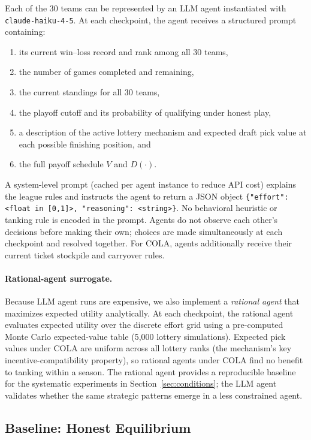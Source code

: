 \documentclass{article}
\begin{document}
Each of the 30 teams can be represented by an LLM agent instantiated with
\texttt{claude-haiku-4-5}.
At each checkpoint, the agent receives a structured prompt containing:
\begin{enumerate}
  \item its current win--loss record and rank among all 30 teams,
  \item the number of games completed and remaining,
  \item the current standings for all 30 teams,
  \item the playoff cutoff and its probability of qualifying under honest play,
  \item a description of the active lottery mechanism and expected draft pick
  value at each possible finishing position, and
  \item the full payoff schedule $V$ and $D(\cdot)$.
\end{enumerate}
A system-level prompt (cached per agent instance to reduce API cost) explains
the league rules and instructs the agent to return a JSON object
\verb|{"effort": <float in [0,1]>, "reasoning": <string>}|.
No behavioral heuristic or tanking rule is encoded in the prompt.
Agents do not observe each other's decisions before making their own; choices
are made simultaneously at each checkpoint and resolved together.
For COLA, agents additionally receive their current ticket stockpile and
carryover rules.

\paragraph{Rational-agent surrogate.}
Because LLM agent runs are expensive, we also implement a \emph{rational
agent} that maximizes expected utility analytically.
At each checkpoint, the rational agent evaluates expected utility over the
discrete effort grid using a pre-computed Monte Carlo expected-value table
(5{,}000 lottery simulations).
Expected pick values under COLA are uniform across all lottery ranks (the
mechanism's key incentive-compatibility property), so rational agents under
COLA find no benefit to tanking within a season.
The rational agent provides a reproducible baseline for the systematic
experiments in Section~\ref{sec:conditions}; the LLM agent validates whether
the same strategic patterns emerge in a less constrained agent.

\subsection{Baseline: Honest Equilibrium}
\end{document}
